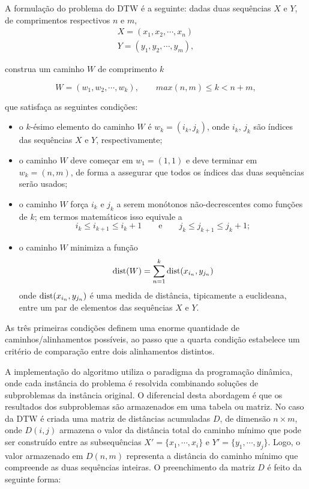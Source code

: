 A formulação do problema \citep{salvador2007toward} do DTW é a seguinte: dadas duas sequências $X$ e $Y$, de comprimentos respectivos $n$ e $m$,
\begin{align*}
    X = (x_1, x_2, \cdots, x_n) \\
    Y = (y_1, y_2, \cdots, y_m),
\end{align*}

construa um caminho $W$ de comprimento $k$

\begin{equation*}
    W = (w_1, w_2, \cdots, w_k), \qquad max(n, m) \leq k < n + m,
\end{equation*}

\noindent que satisfaça as seguintes condições:

\begin{itemize}
\item o $k$-ésimo elemento do caminho $W$ é $w_k = (i_k, j_k)$, onde $i_k$, $j_k$ são índices das sequências $X$ e $Y$, respectivamente;
\item o caminho $W$ deve começar em $w_1 = (1, 1)$ e deve terminar em $w_k = (n, m)$, de forma a assegurar que todos os índices das duas sequências serão usados;
\item o caminho $W$ força $i_k$ e $j_k$ a serem monótonos não-decrescentes como funções de $k$; em termos matemáticos isso equivale a
\begin{equation*}
    i_k \leq i_{k+1} \leq i_k + 1 \qquad \mbox{e} \qquad j_k\leq j_{k+1} \leq j_k + 1;
\end{equation*}
\item o caminho $W$ minimiza a função 
\begin{equation*}
    \mbox{dist}(W) = \sum_{n=1}^{k} \mbox{dist}(x_{i_n}, y_{j_n})
\end{equation*}
onde $\mbox{dist}(x_{i_n}, y_{j_n})$ é uma medida de distância, tipicamente a euclideana, entre um par de elementos das sequências $X$ e $Y$.
\end{itemize}

As três primeiras condições definem uma enorme quantidade de caminhos/alinhamentos possíveis, ao passo que a quarta condição estabelece um critério de comparação entre dois alinhamentos distintos.

A implementação do algoritmo utiliza o paradigma da programação dinâmica, onde cada instância do problema é resolvida combinando soluções de subproblemas da instância original. O diferencial desta abordagem é que os resultados dos subproblemas são armazenados em uma tabela ou matriz. No caso da DTW é criada uma matriz de distâncias acumuladas $D$, de dimensão $n \times m$, onde $D(i, j)$ armazena o valor da distância total do caminho mínimo que pode ser construído entre as subsequências $X' = \{x_1, \cdots, x_i\}$ e $Y' = \{y_1, \cdots, y_j\}$. Logo, o valor armazenado em $D(n, m)$ representa a distância do caminho mínimo que compreende as duas sequências inteiras. O preenchimento da matriz $D$ é feito da seguinte forma:

